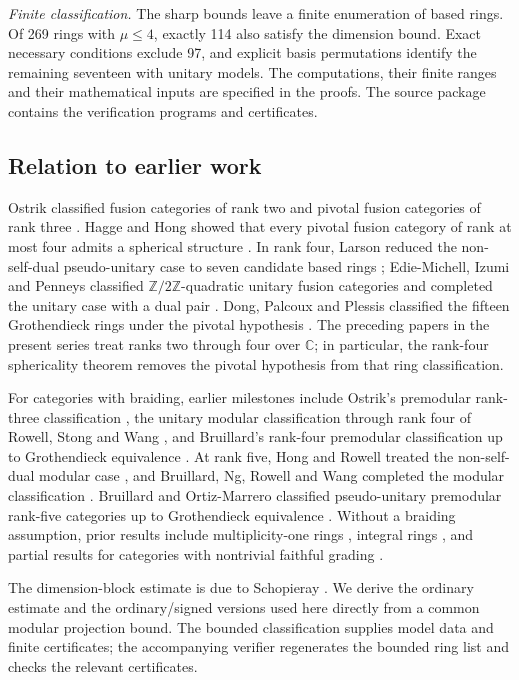 \documentclass[11pt,a4paper]{article}
\numberwithin{equation}{section}
\begin{document}
\emph{Finite classification.}
The sharp bounds leave a finite enumeration of based rings.
Of 269 rings with $\mu\le4$, exactly 114 also satisfy the dimension
bound. Exact necessary conditions exclude 97, and explicit basis
permutations identify the remaining seventeen with unitary models.
The computations, their finite ranges and their mathematical inputs
are specified in the proofs. The source package contains the
verification programs and certificates.

\subsection*{Relation to earlier work}
Ostrik classified fusion categories of rank two and pivotal fusion
categories of rank three \cite{Ostrik2,Ostrik3}. Hagge and Hong showed
that every pivotal fusion category of rank at most four admits a
spherical structure \cite[Lemma~4]{HH}. In rank four, Larson reduced
the non-self-dual pseudo-unitary case to seven candidate based rings
\cite{Larson}; Edie-Michell, Izumi and Penneys classified
$\mathbb Z/2\mathbb Z$-quadratic unitary fusion categories and completed
the unitary case with a dual pair \cite{EIP}. Dong, Palcoux and Plessis
classified the fifteen Grothendieck rings under the pivotal hypothesis
\cite[Theorem~1.1]{DPP}. The preceding papers in the present series
\cite{Rank2,Rank3,Rank4} treat ranks two through four over $\mathbb C$;
in particular, the rank-four sphericality theorem removes the pivotal
hypothesis from that ring classification.

For categories with braiding, earlier milestones include Ostrik's
premodular rank-three classification \cite{OstrikPremod3}, the unitary
modular classification through rank four of Rowell, Stong and Wang
\cite{RSW}, and Bruillard's rank-four premodular classification up to
Grothendieck equivalence \cite{Bruillard4}. At rank five, Hong and
Rowell treated the non-self-dual modular case \cite{HR}, and Bruillard,
Ng, Rowell and Wang completed the modular classification \cite{BNRW}.
Bruillard and Ortiz-Marrero classified pseudo-unitary premodular
rank-five categories up to Grothendieck equivalence \cite{BO5}.
Without a braiding assumption, prior results include multiplicity-one
rings \cite{LPR}, integral rings \cite{ABDP}, and partial results for
categories with nontrivial faithful grading \cite{WD}.

The dimension-block estimate is due to Schopieray
\cite{SchopierayBlock}. We derive the ordinary estimate and the
ordinary/signed versions used here directly from a common modular
projection bound. The bounded classification \cite{Rank5Bounded}
supplies model data and finite certificates; the accompanying verifier
regenerates the bounded ring list and checks the relevant certificates.
\end{document}
